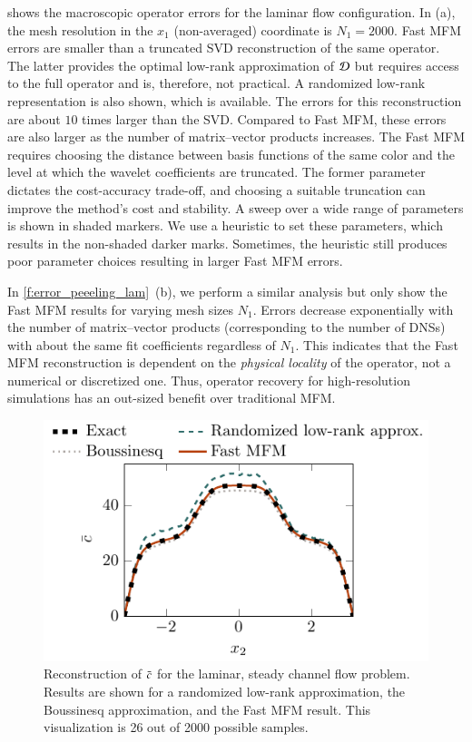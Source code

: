 \documentclass[11pt,sort&compress]{elsarticle}
\begin{document}
 shows the macroscopic operator errors for the laminar flow configuration.
In (a), the mesh resolution in the $x_1$ (non-averaged) coordinate is $N_1 = 2000$.
Fast MFM errors are smaller than a truncated SVD reconstruction of the same operator. 
The latter provides the optimal low-rank approximation of $\mathcal{D}$ but requires access to the full operator and is, therefore, not practical.
A randomized low-rank representation is also shown, which is available.
The errors for this reconstruction are about $10$ times larger than the SVD.
Compared to Fast MFM, these errors are also larger as the number of matrix--vector products increases.
The Fast MFM requires choosing the distance between basis functions of the same color and the level at which the wavelet coefficients are truncated. 
The former parameter dictates the cost-accuracy trade-off, and choosing a suitable truncation can improve the method's cost and stability.
A sweep over a wide range of parameters is shown in shaded markers.
We use a heuristic to set these parameters, which results in the non-shaded darker marks. 
Sometimes, the heuristic still produces poor parameter choices resulting in larger Fast MFM errors.

In \cref{f:error_peeeling_lam}~(b), we perform a similar analysis but only show the Fast MFM results for varying mesh sizes $N_1$.
Errors decrease exponentially with the number of matrix--vector products (corresponding to the number of DNSs) with about the same fit coefficients regardless of $N_1$.
This indicates that the Fast MFM reconstruction is dependent on the \textit{physical locality} of the operator, not a numerical or discretized one. 
Thus, operator recovery for high-resolution simulations has an out-sized benefit over traditional MFM. 

\begin{figure}
    \centering
    \includegraphics[scale=1]{figures/laminar-reconstructions.pdf}
    \caption{
        Reconstruction of $\bar{c}$ for the laminar, steady channel flow problem. 
        Results are shown for a randomized low-rank approximation, the Boussinesq approximation, and the Fast MFM result. 
        This visualization is 26 out of 2000 possible samples.
    }
    \label{f:lam-reconstructions}
\end{figure}
\end{document}
